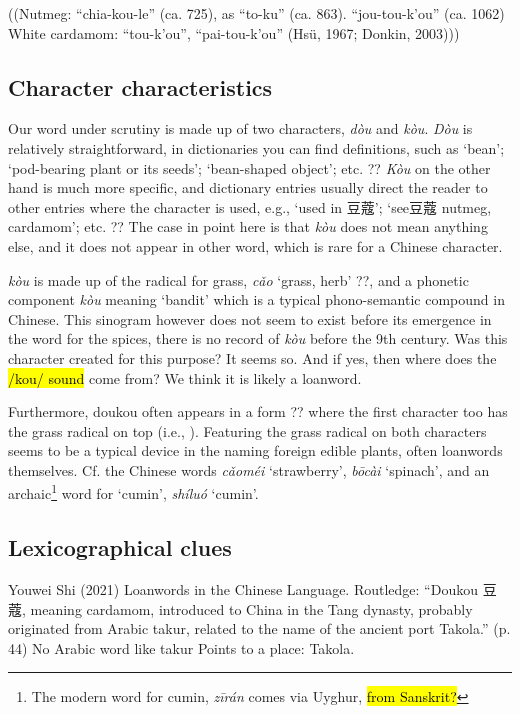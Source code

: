\documentclass[12pt]{article}
\newcommand{\tc}[1]{\traditionalchinesefont{#1}\rmfamily}
\begin{document}
((Nutmeg: “chia-kou-le” (ca. 725), as “to-ku” (ca. 863). “jou-tou-k’ou” (ca. 1062)
White cardamom: “tou-k’ou”, “pai-tou-k’ou” (Hsü, 1967; Donkin, 2003)))


\subsection{Character characteristics}

Our word under scrutiny is made up of two characters, \tc{豆} \textit{dòu} and \tc{蔻} \textit{kòu}. \textit{Dòu} is relatively straightforward, in dictionaries you can find definitions, such as `bean'; `pod-bearing plant or its seeds'; `bean-shaped object'; etc. ?? \textit{Kòu} on the other hand is much more specific, and dictionary entries usually direct the reader to other entries where the character is used, e.g., `used in 豆蔻'; `see豆蔻 nutmeg, cardamom'; etc. ?? The case in point here is that \textit{kòu} does not mean anything else, and it does not appear in other word, which is rare for a Chinese character. 

\tc{蔻} \textit{kòu} is made up of the radical for grass, \tc{艹} \textit{cǎo} `grass, herb' ??, and a phonetic component \tc{寇} \textit{kòu} meaning `bandit' which is a typical phono-semantic compound in Chinese. This sinogram however does not seem to exist before its emergence in the word for the spices, there is no record of \tc{蔻} \textit{kòu} before the 9th century. Was this character created for this purpose? It seems so. And if yes, then where does the \hl{/kou/ sound} come from? We think it is likely a loanword.

Furthermore, doukou often appears in a form ?? where the first character too has the grass radical on top (i.e., \tc{荳蔻}). Featuring the grass radical on both characters seems to be a typical device in the naming foreign edible plants, often loanwords themselves. Cf. the Chinese words \tc{草莓} \textit{cǎoméi} `strawberry', \tc{菠菜} \textit{bōcài} `spinach', and an archaic\footnote{The modern word for cumin, \tc{孜然} \textit{zī​rán} comes via Uyghur, \hl{from Sanskrit?}} word for `cumin', \tc{蒔蘿} \textit{shíluó} `cumin'.

\subsection{Lexicographical clues}

Youwei Shi (2021) Loanwords in the Chinese Language. Routledge:
	“Doukou 豆蔻, meaning cardamom, introduced to China in the 	Tang dynasty, probably originated from Arabic takur, related to 	the name of the ancient port Takola.” (p. 44)
No Arabic word like takur
Points to a place: Takola.
\end{document}
